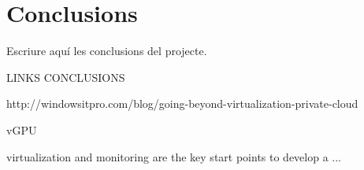 \cleardoublepage
{}
\chapter*{Conclusions}

Escriure aquí les conclusions del projecte. 

LINKS CONCLUSIONS

http://windowsitpro.com/blog/going-beyond-virtualization-private-cloud

vGPU

virtualization and monitoring are the key start points to develop a ...